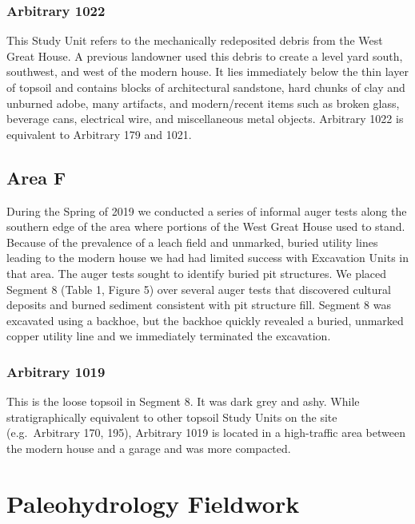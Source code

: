 \documentclass[
  12pt,
]{krantz}
\begin{document}
\hypertarget{arbitrary-1022}{%
\subsection{Arbitrary 1022}\label{arbitrary-1022}}

This Study Unit refers to the mechanically redeposited debris from the
West Great House. A previous landowner used this debris to create a
level yard south, southwest, and west of the modern house. It lies
immediately below the thin layer of topsoil and contains blocks of
architectural sandstone, hard chunks of clay and unburned adobe, many
artifacts, and modern/recent items such as broken glass, beverage cans,
electrical wire, and miscellaneous metal objects. Arbitrary 1022 is
equivalent to Arbitrary 179 and 1021.

\hypertarget{area-f}{%
\section{Area F}\label{area-f}}

During the Spring of 2019 we conducted a series of informal auger tests
along the southern edge of the area where portions of the West Great
House used to stand. Because of the prevalence of a leach field and
unmarked, buried utility lines leading to the modern house we had had
limited success with Excavation Units in that area. The auger tests
sought to identify buried pit structures. We placed Segment 8 (Table 1,
Figure 5) over several auger tests that discovered cultural deposits and
burned sediment consistent with pit structure fill. Segment 8 was
excavated using a backhoe, but the backhoe quickly revealed a buried,
unmarked copper utility line and we immediately terminated the
excavation.

\hypertarget{arbitrary-1019}{%
\subsection{Arbitrary 1019}\label{arbitrary-1019}}

This is the loose topsoil in Segment 8. It was dark grey and ashy. While
stratigraphically equivalent to other topsoil Study Units on the site
(e.g.~Arbitrary 170, 195), Arbitrary 1019 is located in a high-traffic
area between the modern house and a garage and was more compacted.

\hypertarget{paleohydrology-fieldwork}{%
\chapter{Paleohydrology Fieldwork}\label{paleohydrology-fieldwork}}
\end{document}
